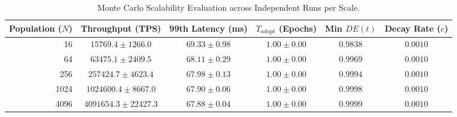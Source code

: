 \begin{table}[t]
\centering
\small
\caption{Monte Carlo Scalability Evaluation across Independent Runs per Scale.}
\label{tab:performance_metrics}
\begin{tabular}{rccccc}
\hline\hline
Population ($N$) & Throughput (TPS) & 99th Latency (ms) & $T_{adapt}$ (Epochs) & Min $DE(t)$ & Decay Rate ($c$) \\ \hline
16 & $15769.4 \pm 1266.0$ & $69.33 \pm 0.98$ & $1.00 \pm 0.00$ & $0.9838$ & $0.0010$ \\
64 & $63475.1 \pm 2409.5$ & $68.11 \pm 0.29$ & $1.00 \pm 0.00$ & $0.9969$ & $0.0010$ \\
256 & $257424.7 \pm 4623.4$ & $67.98 \pm 0.13$ & $1.00 \pm 0.00$ & $0.9994$ & $0.0010$ \\
1024 & $1024600.4 \pm 8667.0$ & $67.90 \pm 0.06$ & $1.00 \pm 0.00$ & $0.9998$ & $0.0010$ \\
4096 & $4091654.3 \pm 22427.3$ & $67.88 \pm 0.04$ & $1.00 \pm 0.00$ & $0.9999$ & $0.0010$ \\
\hline\hline
\end{tabular}
\end{table}
